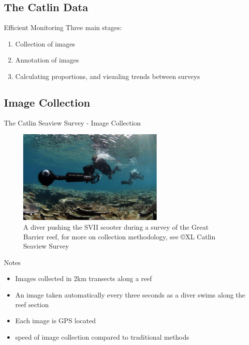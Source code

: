 \documentclass{beamer}
\begin{document}
        \subsection{The Catlin Data}
            \begin{frame}{Efficient Monitoring}
                Three main stages:
                  \begin{enumerate}
                    \item Collection of images
                    \item Annotation of images
                    \item Calculating proportions, and visualing trends between surveys
                  \end{enumerate}
            \end{frame}

        \subsection{Image Collection}
            \begin{frame}{The Catlin Seaview Survey - Image Collection }
                \begin{figure}
                    \centering
                    \includegraphics[width = 0.65\textwidth]{SVII.jpg}
                    \caption{{\footnotesize A diver pushing the SVII scooter during a survey of the Great Barrier reef, for more on collection methodology, see \cite{Gonz16} \copyright XL Catlin Seaview Survey}}
                \end{figure}
            \end{frame}

            \begin{frame}{Notes}
                \begin{itemize}
                  \item Images collected in 2km transects along a reef \cite{Gonz14}
                  \item An image taken automatically every three seconds as a diver swims along the reef section
                  \item Each image is GPS located
                  \item speed of image collection compared to traditional methods
                \end{itemize}
            \end{frame}
\end{document}
